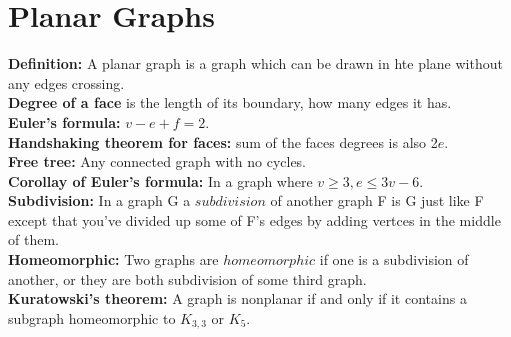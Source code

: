 \documentclass[a4paper]{article}
\begin{document}
\section{Planar Graphs}
{\bf Definition:} A planar graph is a graph which can be drawn in hte plane without any edges crossing.\\
{\bf Degree of a face} is the length of its boundary, how many edges it has.\\
{\bf Euler's formula:} $v-e+f=2$.\\
{\bf Handshaking theorem for faces:} sum of the faces degrees is also 2$e$.\\
{\bf Free tree:} Any connected graph with no cycles.\\
{\bf Corollay of Euler's formula:} In a graph where $v \geq 3, e \leq 3v-6$.\\
{\bf Subdivision:} In a graph G a $subdivision$ of another graph F is G just like F except that you've divided up some of F's edges by adding vertces in the middle of them.\\
{\bf Homeomorphic:} Two graphs are $homeomorphic$ if one is a subdivision of another, or they are both subdivision of some third graph.\\
{\bf Kuratowski's theorem:} A graph is nonplanar if and only if it contains a subgraph homeomorphic to $K_{3,3}$ or $K_5$.\\
\end{document}
